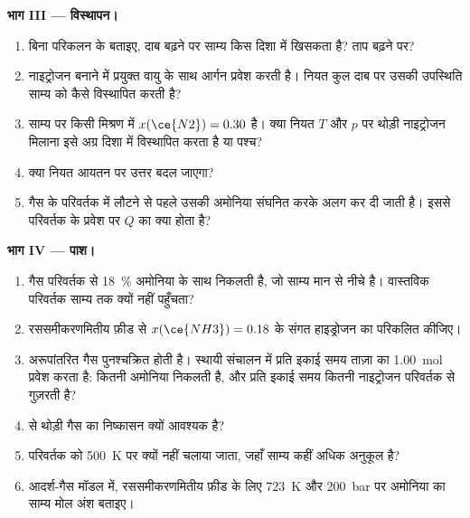 \begin{problem}
\medskip
\noindent\textbf{भाग III --- विस्थापन।}
\begin{enumerate}[resume]
  \item बिना परिकलन के बताइए, दाब बढ़ने पर साम्य किस दिशा में खिसकता
        है? ताप बढ़ने पर?
  \item नाइट्रोजन बनाने में प्रयुक्त वायु के साथ आर्गन प्रवेश करती है। नियत कुल
        दाब पर उसकी उपस्थिति साम्य को कैसे विस्थापित करती है?
  \item साम्य पर किसी मिश्रण में $x(\ce{N2}) = 0.30$ है। क्या नियत $T$ और $p$ पर थोड़ी
        नाइट्रोजन मिलाना इसे अग्र दिशा में विस्थापित करता है या पश्च?
  \item क्या नियत आयतन पर उत्तर बदल जाएगा?
  \item गैस के परिवर्तक में लौटने से पहले उसकी अमोनिया संघनित करके
        अलग कर दी जाती है। इससे परिवर्तक के प्रवेश पर $Q$ का क्या होता है?
\end{enumerate}

\medskip
\noindent\textbf{भाग IV --- पाश।}
\begin{enumerate}[resume]
  \item गैस परिवर्तक से \qty{18}{\percent} अमोनिया के साथ निकलती है, जो
        साम्य मान से नीचे है। वास्तविक परिवर्तक साम्य तक क्यों नहीं
        पहुँचता?
  \item रससमीकरणमितीय फ़ीड से $x(\ce{NH3}) = 0.18$ के संगत हाइड्रोजन का
         परिकलित कीजिए।
  \item अरूपांतरित गैस पुनश्चक्रित होती है। स्थायी संचालन में प्रति इकाई समय
        ताज़ा  का \qty{1.00}{mol} प्रवेश करता है: कितनी अमोनिया निकलती है, और प्रति
        इकाई समय कितनी नाइट्रोजन परिवर्तक से गुज़रती है?
  \item {} से थोड़ी गैस का निष्कासन क्यों आवश्यक है?
  \item परिवर्तक को \qty{500}{K} पर क्यों नहीं चलाया जाता, जहाँ साम्य
        कहीं अधिक अनुकूल है?
  \item आदर्श-गैस मॉडल में, रससमीकरणमितीय फ़ीड के लिए \qty{723}{K} और
        \qty{200}{bar} पर अमोनिया का साम्य मोल अंश बताइए।
\end{enumerate}
\end{problem}

